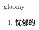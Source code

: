 
\begin{frame}
{\huge gloomy}
\begin{center}
\begin{enumerate}\Large
  \item \textbf{忧郁的}
\end{enumerate}
\end{center}
\end{frame}
